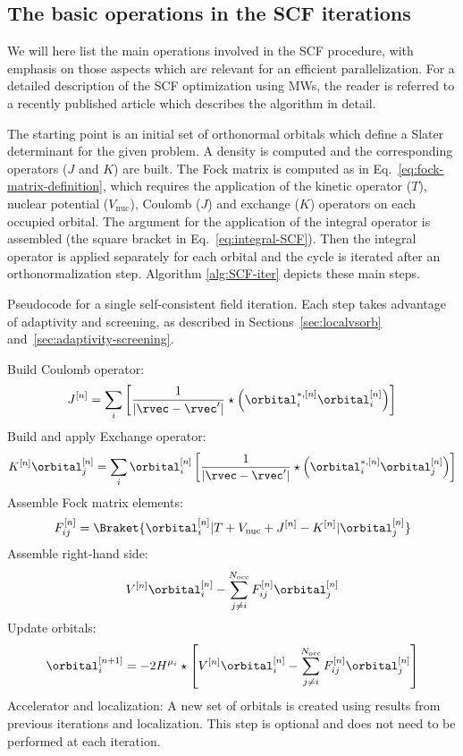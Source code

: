 \subsection{The basic operations in the SCF iterations}

We will here list the main operations involved in the \ac{SCF} procedure, with emphasis on those aspects which are relevant for an efficient parallelization. For a detailed description of the \ac{SCF} optimization using \acp{MW}, the reader is referred to a recently published article which describes the algorithm in detail.\cite{Jensen:2022gg}

The starting point is an initial set of orthonormal orbitals which define a Slater determinant for the given problem. A density is computed and the corresponding operators ($J$ and $K$) are built. The Fock matrix is computed as in Eq.~\eqref{eq:fock-matrix-definition}, which requires the application of the kinetic operator ($T$), nuclear potential ($V_{\mathrm{nuc}}$), Coulomb ($J$) and exchange ($K$) operators on each occupied orbital. The argument for the application of the integral operator is assembled (the square bracket in Eq.~\eqref{eq:integral-SCF}). Then the integral operator is applied separately for each orbital and the cycle is iterated after an orthonormalization step. Algorithm \ref{alg:SCF-iter} depicts these main steps.

\begin{algorithm*}
  \caption{Pseudocode for a single self-consistent field iteration. Each step takes advantage of adaptivity and screening, as described in Sections~\ref{sec:localvsorb} and~\ref{sec:adaptivity-screening}.} 
  \label{alg:SCF-iter}
  \begin{algorithmic}[1]
    
    \State Build Coulomb operator: $$J^{[n]} =
    \sum_i \left[\frac{1}{|\rvec - \rvec^\prime|} \star\left(\orbital_{i}^{*,[n]}\orbital_{i}^{[n]}\right)\right]$$
    \State Build and apply Exchange operator: $$K^{[n]}\orbital_{j}^{[n]} = \sum_i \orbital_{i}^{[n]} \left[\frac{1}{|\rvec - \rvec^\prime|} \star\left(\orbital_{i}^{*,[n]}\orbital_{j}^{[n]}\right)\right]$$
    \State Assemble Fock matrix elements: $$F_{ij}^{[n]} = \Braket{\orbital_{i}^{[n]} | T + V_{\mathrm{nuc}} + J^{[n]} - K^{[n]}| \orbital_{j}^{[n]}}$$
    \State Assemble right-hand side: $$V^{[n]}\orbital_{i}^{[n]} - \sum_{j\neq i}^{N_{\mathrm{occ}}}F_{ij}^{[n]}\orbital_{j}^{[n]}$$
    \State Update orbitals: $$\orbital_{i}^{[n+1]} = -2H^{\mu_{i}}\star\left[ V^{[n]}\orbital_{i}^{[n]} - \sum_{j\neq i}^{N_{\mathrm{occ}}}F_{ij}^{[n]}\orbital_{j}^{[n]}\right]$$
    \State Accelerator and localization: A new set of orbitals is created using results from previous iterations and localization. This step is optional and does not need to be performed at each iteration.
    \EndProcedure
  \end{algorithmic}
\end{algorithm*}

